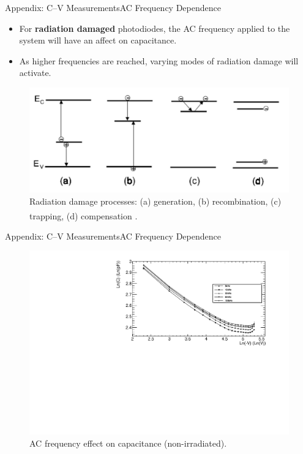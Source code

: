 \documentclass{beamer}
\begin{document}
    \begin{frame}{Appendix: C--V Measurements}{AC Frequency Dependence}
        \begin{itemize}
            \item For \textbf{radiation damaged} photodiodes, the AC frequency applied to the system will have an affect on capacitance.
            \item As higher frequencies are reached, varying modes of radiation damage will activate.
        \end{itemize}
        \begin{figure}
            \centering
            \includegraphics[width = 0.8\linewidth]{DefectEnergyLevels.png}
            \caption{Radiation damage processes: (a) generation, (b) recombination, (c) trapping, (d) compensation \textsuperscript{\cite{Casse}}.}
            \label{fig:damageprocesses}
        \end{figure}
    \end{frame}
    
    \begin{frame}{Appendix: C--V Measurements}{AC Frequency Dependence}
        \begin{figure}
            \centering
            \includegraphics[width = 0.9\linewidth]{Diode24_nonirradiated_CV_frequency_2301.pdf}
            \caption{AC frequency effect on capacitance (non-irradiated).}
            \label{fig:freqcvnonirradiated}
        \end{figure}
    \end{frame}
    
\end{document}
